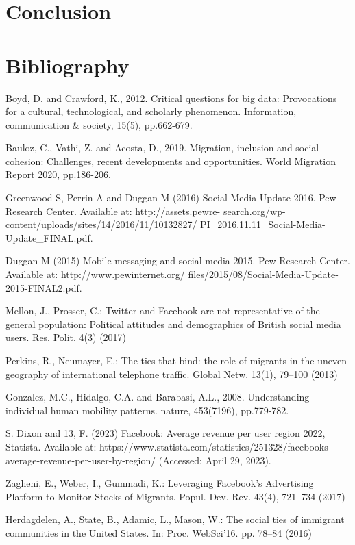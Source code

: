 \documentclass[12pt]{article}
\begin{document}
\section{Conclusion}

\pagebreak 
\section{Bibliography}

Boyd, D. and Crawford, K., 2012. Critical questions for big data: Provocations for a cultural, technological, and scholarly phenomenon. Information, communication & society, 15(5), pp.662-679.

Bauloz, C., Vathi, Z. and Acosta, D., 2019. Migration, inclusion and social cohesion: Challenges, recent developments and opportunities. World Migration Report 2020, pp.186-206.

Greenwood S, Perrin A and Duggan M (2016) Social Media Update
2016. Pew Research Center. Available at: http://assets.pewre-
search.org/wp-content/uploads/sites/14/2016/11/10132827/
PI_2016.11.11_Social-Media-Update_FINAL.pdf.

Duggan M (2015) Mobile messaging and social media 2015. Pew
Research Center. Available at: http://www.pewinternet.org/
files/2015/08/Social-Media-Update-2015-FINAL2.pdf.

Mellon, J., Prosser, C.: Twitter and Facebook are not representative of the general
population: Political attitudes and demographics of British social media users. Res.
Polit. 4(3) (2017)

Perkins, R., Neumayer, E.: The ties that bind: the role of migrants in the uneven
geography of international telephone traffic. Global Netw. 13(1), 79–100 (2013)

Gonzalez, M.C., Hidalgo, C.A. and Barabasi, A.L., 2008. Understanding individual human mobility patterns. nature, 453(7196), pp.779-782.

S. Dixon and 13, F. (2023) Facebook: Average revenue per user region 2022, Statista. Available at: https://www.statista.com/statistics/251328/facebooks-average-revenue-per-user-by-region/ (Accessed: April 29, 2023). 

Zagheni, E., Weber, I., Gummadi, K.: Leveraging Facebook’s Advertising Platform
to Monitor Stocks of Migrants. Popul. Dev. Rev. 43(4), 721–734 (2017)

Herdagdelen, A., State, B., Adamic, L., Mason, W.: The social ties of immigrant
communities in the United States. In: Proc. WebSci’16. pp. 78–84 (2016)
\end{document}
